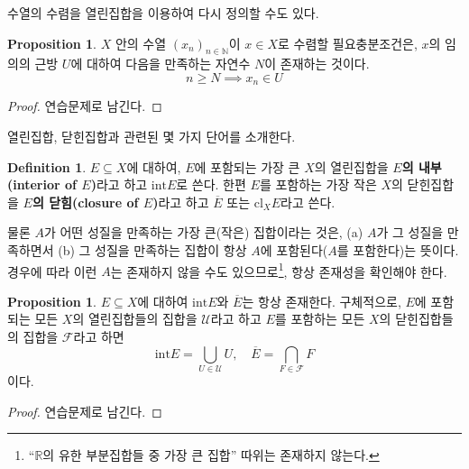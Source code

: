 \documentclass[11pt]{book}
\numberwithin{equation}{chapter}
\def\NN{\mathbb{N}}
\def\RR{\mathbb{R}}
\def\calU{\mathcal{U}}
\def\calF{\mathcal{F}}
\def\Int{\text{int}}
\theoremstyle{definition}
\newtheorem{prop}[thm]{Proposition}
\newtheorem{defn}[thm]{Definition}
\begin{document}
수열의 수렴을 열린집합을 이용하여 다시 정의할 수도 있다.

\begin{prop}
    \(X\) 안의 수열 \((x_n)_{n \in \NN}\)이 \(x \in X\)로 수렴할 필요충분조건은, \(x\)의 임의의 근방 \(U\)에 대하여 다음을 만족하는 자연수 \(N\)이 존재하는 것이다.
    \[
    n \ge N \implies x_n \in U    
    \]
\end{prop}
\begin{proof}
    연습문제로 남긴다.
\end{proof}

열린집합, 닫힌집합과 관련된 몇 가지 단어를 소개한다.

\begin{defn}
    \(E \subseteq X\)에 대하여, \(E\)에 포함되는 가장 큰 \(X\)의 열린집합을 \textbf{\(E\)의 내부(interior of \(E\))}라고 하고 \(\Int E\)로 쓴다. 한편 \(E\)를 포함하는 가장 작은 \(X\)의 닫힌집합을 \textbf{\(E\)의 닫힘(closure of \(E\))}라고 하고 \(\overline{E}\) 또는 \(\text{cl}_X E\)라고 쓴다.
\end{defn}

물론 \(A\)가 어떤 성질을 만족하는 가장 큰(작은) 집합이라는 것은, (a) \(A\)가 그 성질을 만족하면서 (b) 그 성질을 만족하는 집합이 항상 \(A\)에 포함된다(\(A\)를 포함한다)는 뜻이다. 경우에 따라 이런 \(A\)는 존재하지 않을 수도 있으므로\footnote{``\(\RR\)의 유한 부분집합들 중 가장 큰 집합'' 따위는 존재하지 않는다.}, 항상 존재성을 확인해야 한다.

\begin{prop}
    \(E \subseteq X\)에 대하여 \(\Int E\)와 \(\overline{E}\)는 항상 존재한다. 구체적으로, \(E\)에 포함되는 모든 \(X\)의 열린집합들의 집합을 \(\calU\)라고 하고 \(E\)를 포함하는 모든 \(X\)의 닫힌집합들의 집합을 \(\calF\)라고 하면
    \[
    \Int E = \bigcup_{U \in \calU} U, \quad \overline{E} = \bigcap_{F \in \calF} F    
    \]
    이다.
\end{prop}
\begin{proof}
    연습문제로 남긴다.
\end{proof}
\end{document}
